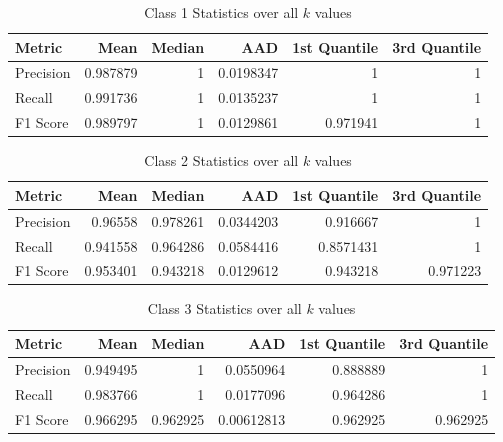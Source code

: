 \documentclass[9pt,technote]{IEEEtran}
\begin{document}
\begin{table}[h]
    \centering
    \caption{Class 1 Statistics over all $k$ values}
    \begin{tabular}{@{}lrrrrr@{}}
		\toprule
		Metric    & Mean &  Median  & AAD &  1st Quantile &  3rd Quantile \\
		\midrule
		Precision & 0.987879 & 1 & 0.0198347 & 1 & 1 \\
		
		Recall &  0.991736 & 1 & 0.0135237 & 1 & 1 \\
		
		F1 Score & 0.989797 & 1 & 0.0129861 & 0.971941 & 1 \\
		\bottomrule
	\end{tabular}
	\label{tab::class1statistics}
\end{table}

\begin{table}[h]
    \centering
    \caption{Class 2 Statistics over all $k$ values}
    \begin{tabular}{@{}lrrrrr@{}}
		\toprule
		Metric    & Mean &  Median  & AAD &  1st Quantile &  3rd Quantile \\
		\midrule
		Precision & 0.96558 & 0.978261 & 0.0344203 & 0.916667 & 1 \\
		
		Recall &  0.941558 & 0.964286 & 0.0584416 &0.8571431 & 1 \\
		
		F1 Score & 0.953401 & 0.943218 & 0.0129612 & 0.943218 & 0.971223 \\
		\bottomrule
	\end{tabular}
	\label{tab::class2statistics}
\end{table}

\begin{table}[h]
    \centering
    \caption{Class 3 Statistics over all $k$ values}
    \begin{tabular}{@{}lrrrrr@{}}
		\toprule
		Metric    & Mean &  Median  & AAD &  1st Quantile &  3rd Quantile \\
		\midrule
		Precision & 0.949495 & 1 & 0.0550964 & 0.888889 & 1 \\
		
		Recall &  0.983766 & 1 & 0.0177096 & 0.964286 & 1 \\
		
		F1 Score & 0.966295 & 0.962925 & 0.00612813 & 0.962925 & 0.962925 \\
		\bottomrule
	\end{tabular}
	\label{tab::class3statistics}
\end{table}
\end{document}
